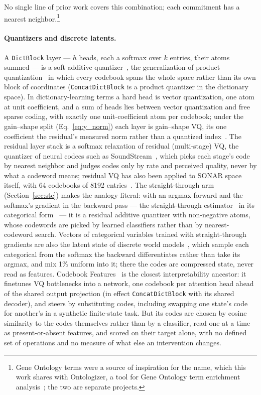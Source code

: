 No single line of prior work covers this combination; each commitment has
a nearest neighbor.\footnote{Gene Ontology terms were a source of
inspiration for the name, which this work shares with Ontologizer, a tool
for Gene Ontology term enrichment analysis~\cite{bauer2008}; the two are
separate projects.}

\paragraph{Quantizers and discrete latents.}
A \texttt{DictBlock} layer --- $h$ heads, each a softmax over $k$ entries,
their atoms summed --- is a soft additive quantizer~\cite{babenko2014}, the
generalization of product quantization~\cite{jegou2011} in which every
codebook spans the whole space rather than its own block of coordinates
(\texttt{ConcatDictBlock} is a product quantizer in the dictionary space).
In dictionary-learning terms a hard head is vector quantization, one atom
at unit coefficient, and a sum of heads lies between vector quantization
and free sparse coding, with exactly one unit-coefficient atom per
codebook; under the gain--shape split (Eq.~\eqref{eq:y_norm}) each layer
is gain--shape VQ, its one coefficient the residual's measured norm rather
than a quantized index~\cite{aharon2006}.
The residual layer stack is a softmax relaxation of residual (multi-stage)
VQ, the quantizer of neural codecs such as SoundStream~\cite{zeghidour2021},
which picks each stage's code by nearest neighbor and judges codes only by
rate and perceived quality, never by what a codeword means; residual VQ has
also been applied to SONAR space itself, with 64 codebooks of 8192
entries~\cite{lcmteam2024largeconceptmodelslanguage}. The straight-through
arm (Section~\ref{sec:ste}) makes the analogy literal: with an argmax
forward and the softmax's gradient in the backward pass --- the
straight-through estimator~\cite{bengio2013} in its categorical
form~\cite{jang2017} --- it is a residual additive quantizer with
non-negative atoms, whose codewords are picked by learned classifiers
rather than by nearest-codeword search. Vectors of categorical variables
trained with straight-through gradients are also the latent state of
discrete world models~\cite{hafner2021,hafner2023}, which sample each
categorical from the softmax the backward differentiates rather than take
its argmax, and mix 1\% uniform into it; there the codes are compressed
state, never read as features. Codebook Features~\cite{tamkin2023} is the
closest interpretability ancestor: it finetunes VQ bottlenecks into
a network, one codebook per attention head ahead of the shared output
projection (in effect \texttt{ConcatDictBlock} with its shared decoder),
and steers by substituting codes, including swapping one state's code for
another's in a synthetic finite-state task. But its codes are chosen by
cosine similarity to the codes themselves rather than by a classifier,
read one at a time as present-or-absent features, and scored on their
target alone, with no defined set of operations and no measure of what
else an intervention changes.

